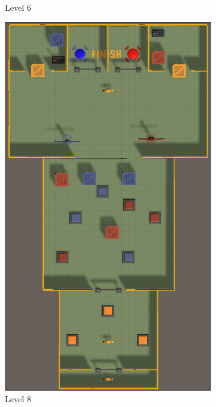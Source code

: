 \begin{figure}[h!]
\begin{subfigure}[b]{0.45\linewidth}
        \caption{Level 6}
        \label{fig:level 6}
      \end{subfigure}
    \begin{subfigure}[b]{0.45\linewidth}
        \includegraphics[width=\linewidth]{images/level_8.png}
        \caption{Level 8}
        \label{fig:level 8}
      \end{subfigure}
    \begin{subfigure}[b]{0.45\linewidth}

\end{subfigure}
\end{figure}
